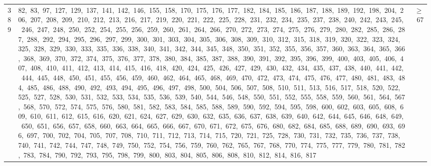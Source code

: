 \begin{longtable}{c|p{}|r}
389 & 82,\ 83,\ 97,\ 127,\ 129,\ 137,\ 141,\ 142,\ 146,\ 155,\ 158,\ 170,\ 175,\ 176,\ 177,\ 182,\ 184,\ 185,\ 186,\ 187,\ 188,\ 189,\ 192,\ 198,\ 204,\ 206,\ 207,\ 208,\ 209,\ 210,\ 212,\ 213,\ 216,\ 217,\ 219,\ 220,\ 221,\ 222,\ 225,\ 228,\ 231,\ 232,\ 234,\ 235,\ 237,\ 238,\ 240,\ 242,\ 243,\ 245,\ 246,\ 247,\ 248,\ 250,\ 252,\ 254,\ 255,\ 256,\ 259,\ 260,\ 261,\ 264,\ 266,\ 270,\ 272,\ 273,\ 274,\ 275,\ 276,\ 279,\ 280,\ 282,\ 285,\ 286,\ 287,\ 288,\ 292,\ 294,\ 295,\ 296,\ 297,\ 299,\ 300,\ 301,\ 303,\ 304,\ 305,\ 306,\ 308,\ 309,\ 310,\ 312,\ 315,\ 318,\ 319,\ 320,\ 322,\ 323,\ 324,\ 325,\ 328,\ 329,\ 330,\ 333,\ 335,\ 336,\ 338,\ 340,\ 341,\ 342,\ 344,\ 345,\ 348,\ 350,\ 351,\ 352,\ 355,\ 356,\ 357,\ 360,\ 363,\ 364,\ 365,\ 366,\ 368,\ 369,\ 370,\ 372,\ 374,\ 375,\ 376,\ 377,\ 378,\ 380,\ 384,\ 385,\ 387,\ 388,\ 390,\ 391,\ 392,\ 395,\ 396,\ 399,\ 400,\ 403,\ 405,\ 406,\ 407,\ 408,\ 410,\ 411,\ 412,\ 413,\ 414,\ 415,\ 416,\ 418,\ 420,\ 424,\ 425,\ 426,\ 427,\ 429,\ 430,\ 432,\ 434,\ 435,\ 437,\ 438,\ 440,\ 441,\ 442,\ 444,\ 445,\ 448,\ 450,\ 451,\ 455,\ 456,\ 459,\ 460,\ 462,\ 464,\ 465,\ 468,\ 469,\ 470,\ 472,\ 473,\ 474,\ 475,\ 476,\ 477,\ 480,\ 481,\ 483,\ 484,\ 485,\ 486,\ 488,\ 490,\ 492,\ 493,\ 494,\ 495,\ 496,\ 497,\ 498,\ 500,\ 504,\ 506,\ 507,\ 508,\ 510,\ 511,\ 513,\ 516,\ 517,\ 518,\ 520,\ 522,\ 525,\ 527,\ 528,\ 530,\ 531,\ 532,\ 533,\ 534,\ 535,\ 536,\ 539,\ 540,\ 544,\ 546,\ 548,\ 550,\ 551,\ 552,\ 555,\ 558,\ 559,\ 560,\ 561,\ 564,\ 567,\ 568,\ 570,\ 572,\ 574,\ 575,\ 576,\ 580,\ 581,\ 582,\ 583,\ 584,\ 585,\ 588,\ 589,\ 590,\ 592,\ 594,\ 595,\ 598,\ 600,\ 602,\ 603,\ 605,\ 608,\ 609,\ 610,\ 611,\ 612,\ 615,\ 616,\ 620,\ 621,\ 624,\ 627,\ 629,\ 630,\ 632,\ 635,\ 636,\ 637,\ 638,\ 639,\ 640,\ 642,\ 644,\ 645,\ 646,\ 648,\ 649,\ 650,\ 651,\ 656,\ 657,\ 658,\ 660,\ 663,\ 664,\ 665,\ 666,\ 667,\ 670,\ 671,\ 672,\ 675,\ 676,\ 680,\ 682,\ 684,\ 685,\ 688,\ 689,\ 690,\ 693,\ 696,\ 697,\ 700,\ 702,\ 704,\ 705,\ 707,\ 708,\ 710,\ 711,\ 712,\ 713,\ 714,\ 715,\ 720,\ 721,\ 725,\ 728,\ 730,\ 731,\ 732,\ 735,\ 736,\ 737,\ 738,\ 740,\ 741,\ 742,\ 744,\ 747,\ 748,\ 749,\ 750,\ 752,\ 754,\ 756,\ 759,\ 760,\ 762,\ 765,\ 767,\ 768,\ 770,\ 774,\ 775,\ 777,\ 779,\ 780,\ 781,\ 782,\ 783,\ 784,\ 790,\ 792,\ 793,\ 795,\ 798,\ 799,\ 800,\ 803,\ 804,\ 805,\ 806,\ 808,\ 810,\ 812,\ 814,\ 816,\ 817 & $\ge$ 67 \\

\end{longtable}
